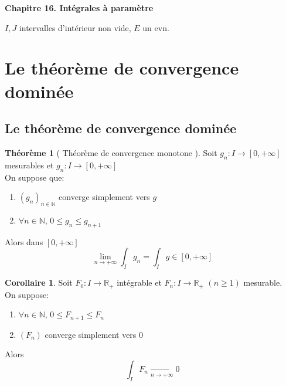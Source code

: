 \documentclass[10pt,a4paper]{article}
\theoremstyle{definition}
\newtheorem{theorem}[proposition]{Théorème}
\newtheorem{corollary}[proposition]{Corollaire}
\begin{document}
\renewcommand{\labelitemi}{\textbullet}

\renewcommand{\labelenumi}{(\roman{enumi})}

\begin{center}
{\Large \textbf{Chapitre 16. Intégrales à paramètre}}
\end{center}

\noindent \(I, J\) intervalles d'intérieur non vide, \(E\) un evn.

\renewcommand{\labelenumi}{\arabic{enumi}.}

\section{Le théorème de convergence dominée}
\subsection{Le théorème de convergence dominée}
\begin{theorem}[ Théorème de convergence monotone ]
    Soit \(g_n: I \to [0, +\infty]\) mesurables et \(g_n: I \to [0, +\infty]\) \\
    On suppose que:
    \begin{enumerate}
        \item \((g_n)_{n \in \mathbb{N}}\) converge simplement vers \(g\)
        \item \(\forall n \in \mathbb{N}\), \(0 \leq g_n \leq g_{n + 1}\)
    \end{enumerate}
    Alors dans \([0, +\infty]\)
    \[\lim_{n \to +\infty}\int_{I} g_n = \int_{I} g \in [0, +\infty]\]
\end{theorem}
\begin{corollary}
    Soit \(F_0 : I \to \mathbb{R}_+\) intégrable et \(F_n: I \to \mathbb{R}_+\) \((n \geq 1)\) mesurable. \\
    On suppose:
    \begin{enumerate}
        \item \(\forall n \in \mathbb{N}\), \(0 \leq F_{n + 1} \leq F_n\)
        \item \((F_n)\) converge simplement vers 0
    \end{enumerate}
    Alors
    \[\int_{I} F_n \xrightarrow[n \to +\infty]{} 0\]
\end{corollary}
\end{document}
